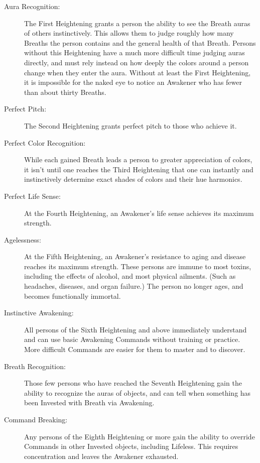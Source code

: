 \begin{description}

	\item[Aura Recognition:]
	The First Heightening grants a person the ability to see the Breath auras of others instinctively. This allows them to judge roughly how many Breaths the person contains and the general health of that Breath. Persons without this Heightening have a much more difficult time judging auras directly, and must rely instead on how deeply the colors around a person change when they enter the aura. Without at least the First Heightening, it is impossible for the naked eye to notice an Awakener who has fewer than about thirty Breaths.

	\item[Perfect Pitch:]
	The Second Heightening grants perfect pitch to those who achieve it.

	\item[Perfect Color Recognition:]
	While each gained Breath leads a person to greater appreciation of colors, it isn’t until one reaches the Third Heightening that one can instantly and instinctively determine exact shades of colors and their hue harmonics.

	\item[Perfect Life Sense:]
	At the Fourth Heightening, an Awakener’s life sense achieves its maximum strength.

	\item[Agelessness:]
	At the Fifth Heightening, an Awakener’s resistance to aging and disease reaches its maximum strength. These persons are immune to most toxins, including the effects of alcohol, and most physical ailments. (Such as headaches, diseases, and organ failure.) The person no longer ages, and becomes functionally immortal.

	\item[Instinctive Awakening:]
	All persons of the Sixth Heightening and above immediately understand and can use basic Awakening Commands without training or practice. More difficult Commands are easier for them to master and to discover.

	\item[Breath Recognition:]
	Those few persons who have reached the Seventh Heightening gain the ability to recognize the auras of objects, and can tell when something has been Invested with Breath via Awakening.

	\item[Command Breaking:]
	Any persons of the Eighth Heightening or more gain the ability to override Commands in other Invested objects, including Lifeless. This requires concentration and leaves the Awakener exhausted.


\end{description}
